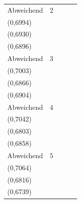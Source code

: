 {\begin{tabular}{llccc}
Abweichend & 2 & \shortstack{$0{,}6908 \pm 0{,}0644$\\(0{,}6994)} & \shortstack{$0{,}6916 \pm 0{,}0567$\\(0{,}6930)} & \shortstack{$0{,}6919 \pm 0{,}0619$\\(0{,}6896)} \\
Abweichend & 3 & \shortstack{$0{,}6961 \pm 0{,}1017$\\(0{,}7003)} & \shortstack{$0{,}6831 \pm 0{,}0657$\\(0{,}6866)} & \shortstack{$0{,}6919 \pm 0{,}0576$\\(0{,}6904)} \\
Abweichend & 4 & \shortstack{$0{,}6878 \pm 0{,}1005$\\(0{,}7042)} & \shortstack{$0{,}6955 \pm 0{,}0558$\\(0{,}6803)} & \shortstack{$0{,}7009 \pm 0{,}0700$\\(0{,}6858)} \\
Abweichend & 5 & \shortstack{$0{,}6720 \pm 0{,}1064$\\(0{,}7064)} & \shortstack{$0{,}6850 \pm 0{,}0633$\\(0{,}6816)} & \shortstack{$0{,}6837 \pm 0{,}0633$\\(0{,}6739)} \\
\hline
\end{tabular}}
